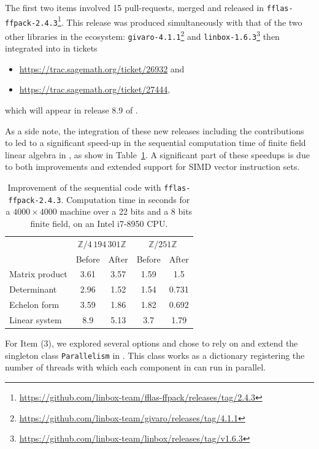 \documentclass{deliverablereport}
\begin{document}
The first two items involved 15 pull-requests, merged and released in
\texttt{fflas-ffpack-2.4.3}\footnote{\url{https://github.com/linbox-team/fflas-ffpack/releases/tag/2.4.3}}. This release
was produced simultaneously with that of the two other libraries in the \Linbox
ecosystem: \texttt{givaro-4.1.1}\footnote{\url{https://github.com/linbox-team/givaro/releases/tag/4.1.1}} and
\texttt{linbox-1.6.3}\footnote{\url{https://github.com/linbox-team/linbox/releases/tag/v1.6.3}} then integrated into \SageMath
in tickets
\begin{itemize}
\item  \url{https://trac.sagemath.org/ticket/26932} and
\item  \url{https://trac.sagemath.org/ticket/27444},
\end{itemize}
which will appear in release 8.9 of \SageMath.

As a side note, the integration of these new releases including the contributions to  led
to a significant speed-up in the sequential computation time of finite field linear algebra in \SageMath, as show in
Table~\ref{tab:release}.
A significant part of these speedups is due to both improvements and extended support for SIMD vector
instruction sets.

%
\begin{table}[htb]
  \begin{tabular}{lcccc}
    \toprule
&    \multicolumn{2}{c}{$\mathbb{Z}/4\,194\,301\mathbb{Z}$}&    \multicolumn{2}{c}{$\mathbb{Z}/251\mathbb{Z}$}\\
    & Before & After & Before & After\\
    \midrule
    Matrix product & 3.61& 3.57&1.59&1.5 \\
    Determinant &  2.96& 1.52 &1.54&0.731\\
    Echelon form & 3.59& 1.86 & 1.82& 0.692 \\
    Linear system & 8.9 & 5.13 & 3.7&1.79\\ 
    \bottomrule
  \end{tabular}
  \vspace{1em}
  
  \caption{Improvement of the sequential code with \texttt{fflas-ffpack-2.4.3}. Computation time in seconds for a
    $4000\times    4000$ machine over a 22 bits and a 8 bits finite field, on an Intel i7-8950 CPU.}
  \label{tab:release}
\end{table}
%

For Item (3), we explored several options and chose to rely on and extend the singleton class \texttt{Parallelism} in
\SageMath. This class works as a dictionary registering the number of threads with which each component in \SageMath can
run in parallel.
\end{document}
